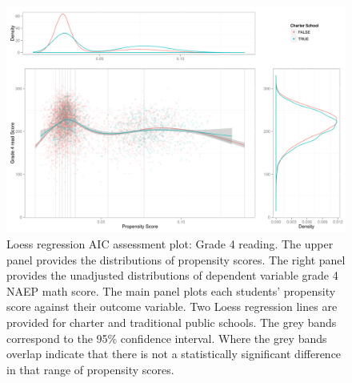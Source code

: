 \begin{figure}[h!]
\begin{center}
\includegraphics{../Figures2009/g4read-loessAIC.pdf}
\caption[Loess regression AIC assessment plot: Grade 4 reading]{Loess regression AIC assessment plot: Grade 4 reading. The upper panel provides the distributions of propensity scores. The right panel provides the unadjusted distributions of dependent variable grade 4 NAEP math score. The main panel plots each students' propensity score against their outcome variable. Two Loess regression lines are provided for charter and traditional public schools. The grey bands correspond to the 95\% confidence interval. Where the grey bands overlap indicate that there is not a statistically significant difference in that range of propensity scores.}
\label{fig:g4read:loess}
\end{center}
\end{figure}

